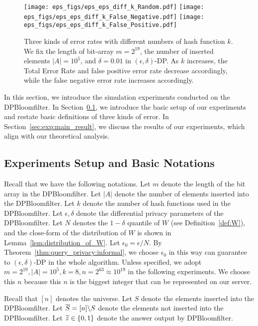 \begin{figure*}[!ht]
\centering
\texttt{[image: eps\_figs/eps\_eps\_diff\_k\_Random.pdf]}
\texttt{[image: eps\_figs/eps\_eps\_diff\_k\_False\_Negative.pdf]}
\texttt{[image: eps\_figs/eps\_eps\_diff\_k\_False\_Positive.pdf]}
\caption{
Three kinds of error rates with different numbers of hash function $k$.  
We fix the length of bit-array $m=2^{19}$, the number of inserted elements $|A| = 10^5$, and $\delta = 0.01$ in $(\epsilon, \delta)$-DP.
As $k$ increases, the Total Error Rate and false positive error rate decrease accordingly, while the false negative error rate increases accordingly. 
}
\label{fig:eps_diff_k}
\end{figure*}

In this section, we introduce the simulation experiments conducted on the DPBloomfilter.
In Section~\ref{sec:exp:setup}, we introduce the basic setup of our experiments and restate basic definitions of three kinds of error.
In Section~\ref{sec:exp:main_result}, we discuss the results of our experiments, which align with our theoretical analysis. 

\subsection{Experiments Setup and Basic Notations} \label{sec:exp:setup}


Recall that we have the following notations. 
Let $m$ denote the length of the bit array in the DPBloomfilter.
Let $|A|$ denote the number of elements inserted into the DPBloomfilter. 
Let $k$ denote the number of hash functions used in the DPBloomfilter.
Let $\epsilon, \delta$ denote the differential privacy parameters of the DPBloomfilter. 
Let $N$ denotes the $1 - \delta$ quantile of $W$ (see Definition~\ref{def:W}), and the close-form of the distribution of $W$ is shown in Lemma~\ref{lem:distribution_of_W}. 
Let $\epsilon_0 = \epsilon / N$. By Theorem~\ref{thm:query_privacy:informal}, we choose $\epsilon_0$ in this way can guarantee to $(\epsilon, \delta)$-DP in the whole algorithm. 
Unless specified, we adopt $m = 2^{19}, |A| = 10^5, k=8, n = 2^{63} \approx 10^{19}$ in the following experiments. 
We choose this $n$ because this $n$ is the biggest integer that can be represented on our server.

Recall that $[n]$ denotes the universe. 
Let $S$ denote the elements inserted into the DPBloomfilter. 
Let $\overline{S} = [n] \backslash S$ denote the elements not inserted into the DPBloomfilter. Let $\widetilde{z} \in \{ 0, 1 \}$ denote the answer output by DPBloomfilter. 


